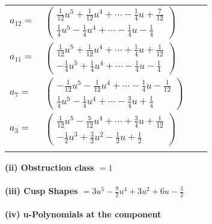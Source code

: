 \documentclass[1p]{elsarticle_modified}
\theoremstyle{definition}
\begin{document}
\begin{tabular}{m{7pt} m{180pt} m{7pt} m{180pt} }
\flushright $a_{12}=$&$\begin{pmatrix}\frac{1}{12} u^5+\frac{1}{12} u^4+\cdots-\frac{1}{4} u+\frac{7}{12}\\\frac{1}{4} u^5-\frac{1}{4} u^4+\cdots-\frac{1}{4} u-\frac{1}{4}\end{pmatrix}$ \\
\flushright $a_{11}=$&$\begin{pmatrix}\frac{1}{12} u^5+\frac{1}{12} u^4+\cdots+\frac{1}{4} u+\frac{1}{12}\\-\frac{1}{4} u^5+\frac{1}{4} u^4+\cdots-\frac{1}{4} u-\frac{1}{4}\end{pmatrix}$ \\
\flushright $a_{7}=$&$\begin{pmatrix}-\frac{1}{12} u^5-\frac{1}{12} u^4+\cdots-\frac{1}{4} u-\frac{1}{12}\\\frac{1}{4} u^5-\frac{1}{4} u^4+\cdots-\frac{3}{4} u+\frac{1}{4}\end{pmatrix}$ \\
\flushright $a_{3}=$&$\begin{pmatrix}\frac{1}{12} u^5-\frac{5}{12} u^4+\cdots+\frac{3}{4} u+\frac{1}{12}\\-\frac{1}{2} u^3+\frac{3}{2} u^2-\frac{1}{2} u+\frac{1}{2}\end{pmatrix}$\\&\end{tabular}
\flushleft \textbf{(ii) Obstruction class $= 1$}\\~\\
\flushleft \textbf{(iii) Cusp Shapes $= 3 u^5-\frac{9}{2} u^4+3 u^2+6 u-\frac{3}{2}$}\\~\\
\newpage\renewcommand{\arraystretch}{1}
\flushleft \textbf{(iv) u-Polynomials at the component}\newline \\
\end{document}
